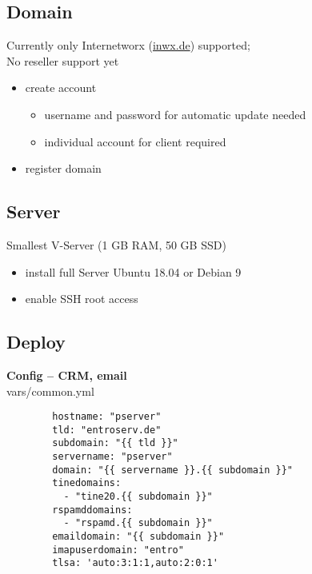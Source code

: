 \documentclass{beamer}
\begin{document}
\subsection{Domain}
\begin{frame}{\insertsection}{\insertsubsection}
	\vspace{-0.5cm}
	Currently only Internetworx (\url{inwx.de}) supported;\\
	No reseller support yet 
	\begin{itemize}
		\item create account
		\begin{itemize}
			\item username and password for automatic update needed
			\item individual account for client required
		\end{itemize}
		\item register domain
	\end{itemize}
\end{frame}	

\subsection{Server}
\begin{frame}{\insertsection}{\insertsubsection}
	\vspace{-0.5cm}
	Smallest V-Server (1 GB RAM, 50 GB SSD)
	\begin{itemize}
		\item install full Server Ubuntu 18.04 or Debian 9
		\item enable SSH root access
	\end{itemize}
\end{frame}	

\subsection{Deploy}
\begin{frame}[fragile]{\insertsection}{\insertsubsection}
	\vspace{-0.5cm}
	\textbf{Config -- CRM, email}\\
	vars/common.yml
    \begin{verbatim}
		hostname: "pserver"
		tld: "entroserv.de"
		subdomain: "{{ tld }}"
		servername: "pserver"
		domain: "{{ servername }}.{{ subdomain }}"
		tinedomains:
		  - "tine20.{{ subdomain }}"
		rspamddomains:
		  - "rspamd.{{ subdomain }}"
		emaildomain: "{{ subdomain }}"
		imapuserdomain: "entro"
		tlsa: 'auto:3:1:1,auto:2:0:1'
	\end{verbatim}
\end{frame}	
\end{document}
